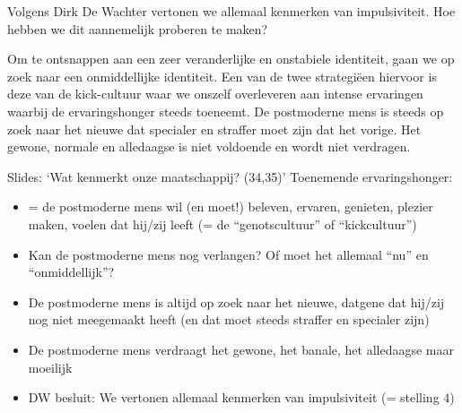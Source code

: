 \documentclass[main.tex]{subfiles}
\begin{document}
\begin{examenvraag}
    \begin{vraag}
        Volgens Dirk De Wachter vertonen we allemaal kenmerken van impulsiviteit. Hoe hebben we dit aannemelijk proberen te maken?
    \end{vraag}

    \begin{antwoord}
        Om te ontsnappen aan een zeer veranderlijke en onstabiele identiteit,‭ ‬		gaan we op zoek naar een onmiddellijke identiteit.‭ ‬Een van de twee 
        strategiëen hiervoor is deze van de kick-cultuur waar we onszelf 
        overleveren aan intense ervaringen waarbij de ervaringshonger steeds 
        toeneemt.‭ ‬De postmoderne mens is steeds op zoek naar het nieuwe dat 
        specialer en straffer moet zijn dat het vorige.‭ ‬Het gewone,‭ ‬normale 
        en alledaagse is niet voldoende en wordt niet verdragen.
        \begin{citaat}{Slides: `Wat kenmerkt onze maatschappij? (34,35)'}
            Toenemende ervaringshonger:
            \begin{itemize}
                \item = de postmoderne mens wil (en moet!) beleven, ervaren, genieten, plezier maken, voelen dat hij/zij leeft (= de “genotscultuur” of “kickcultuur”)
                \item Kan de postmoderne mens nog verlangen? Of moet het allemaal “nu” en “onmiddellijk”?
                \item De postmoderne mens is altijd op zoek naar het nieuwe, datgene dat hij/zij nog niet meegemaakt heeft (en dat moet steeds straffer en specialer zijn)
                \item De postmoderne mens verdraagt het gewone, het banale, het alledaagse maar moeilijk
                \item DW besluit: We vertonen allemaal kenmerken van impulsiviteit (= stelling 4)
            \end{itemize}
        \end{citaat}
    \end{antwoord}
\end{examenvraag}
\end{document}
